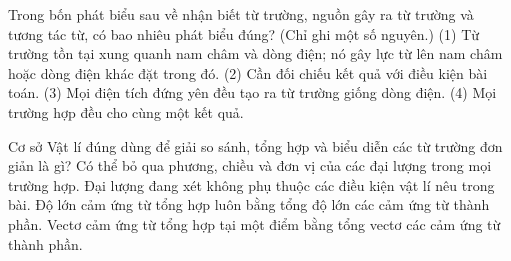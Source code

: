 \begin{ex}
Trong bốn phát biểu sau về nhận biết từ trường, nguồn gây ra từ trường và tương tác từ, có bao nhiêu phát biểu đúng? (Chỉ ghi một số nguyên.) (1) Từ trường tồn tại xung quanh nam châm và dòng điện; nó gây lực từ lên nam châm hoặc dòng điện khác đặt trong đó. (2) Cần đối chiếu kết quả với điều kiện bài toán. (3) Mọi điện tích đứng yên đều tạo ra từ trường giống dòng điện. (4) Mọi trường hợp đều cho cùng một kết quả.
\end{ex}

\begin{ex}
Cơ sở Vật lí đúng dùng để giải so sánh, tổng hợp và biểu diễn các từ trường đơn giản là gì?
\choice
{Có thể bỏ qua phương, chiều và đơn vị của các đại lượng trong mọi trường hợp.}
{Đại lượng đang xét không phụ thuộc các điều kiện vật lí nêu trong bài.}
{Độ lớn cảm ứng từ tổng hợp luôn bằng tổng độ lớn các cảm ứng từ thành phần.}
{\True Vectơ cảm ứng từ tổng hợp tại một điểm bằng tổng vectơ các cảm ứng từ thành phần.}
\end{ex}

